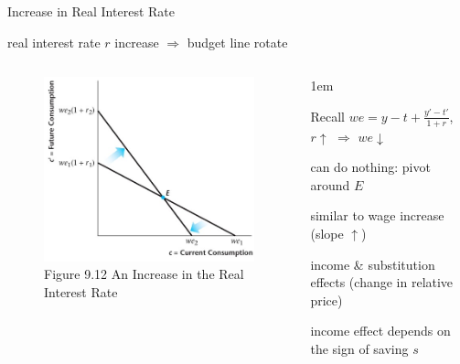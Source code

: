 \documentclass[11pt,aspectratio=43,usenames,dvipsnames]{beamer}
\let\olditemize=\itemize
\let\endolditemize=\enditemize
\renewenvironment{itemize}{\olditemize \itemsep1em}{\endolditemize}
\theoremstyle{definition}
\begin{document}
\begin{frame}{Increase in Real Interest Rate}
\label{slide:Increase_in_Real_Interest_Rate}
\begin{center}
real interest rate $ r $ increase  $ \Rightarrow  $ budget line \alert{rotate}
\end{center}
\begin{columns}
    \begin{column}{0.5\textwidth}
        \begin{figure}
            \caption{\scriptsize Figure 9.12  An Increase in the Real Interest Rate}
            \includegraphics[width=\textwidth]{./figures/Figure9_12.jpg}
        \end{figure}
    \end{column}
    \begin{column}{0.5\textwidth}
        \begin{itemize}
            \item Recall $ \displaystyle  we = y - t + \frac{y' - t'}{1+r} $, $ r \uparrow  $ $ \Rightarrow  $ $ we \downarrow  $
            \item can do nothing: pivot around $ E $
            \item similar to \alert{wage increase} (slope $ \uparrow  $)
            \item income \& substitution effects (change in relative price)
            \item income effect depends on the sign of saving $ s $
        \end{itemize}
    \end{column}
\end{columns}
\end{frame}
\end{document}
